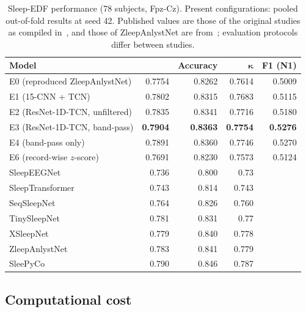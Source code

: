 \documentclass[11pt,a4paper]{article}
\newcommand{\mf}{\text{macro-F1}}
\begin{document}
\begin{table}[t]
\centering
\caption{Sleep-EDF performance (78 subjects, Fpz-Cz). Present configurations: pooled out-of-fold
results at seed 42. Published values are those of the original studies as compiled
in~\cite{lee2024sleepyco}, and those of ZleepAnlystNet are from~\cite{jadhav2024zleepanlystnet};
evaluation protocols differ between studies.}
\label{tab:sleepedf-performance}
\small
\begin{tabular}{lrrrr}
\toprule
\textbf{Model} & \textbf{\mf} & \textbf{Accuracy} & $\boldsymbol{\kappa}$ & \textbf{F1 (N1)} \\
\midrule
E0 (reproduced ZleepAnlystNet) & 0.7754 & 0.8262 & 0.7614 & 0.5009 \\
E1 (15-CNN + TCN)              & 0.7802 & 0.8315 & 0.7683 & 0.5115 \\
E2 (ResNet-1D-TCN, unfiltered) & 0.7835 & 0.8341 & 0.7716 & 0.5180 \\
E3 (ResNet-1D-TCN, band-pass)  & \textbf{0.7904} & \textbf{0.8363} & \textbf{0.7754} & \textbf{0.5276} \\
E4 (band-pass only)            & 0.7891 & 0.8360 & 0.7746 & 0.5270 \\
E6 (record-wise $z$-score)     & 0.7691 & 0.8230 & 0.7573 & 0.5124 \\
\midrule
SleepEEGNet~\cite{mousavi2019sleepeegnet} & 0.736 & 0.800 & 0.73 & \\
SleepTransformer~\cite{phan2022sleeptransformer} & 0.743 & 0.814 & 0.743 & \\
SeqSleepNet~\cite{phan2019seqsleepnet} & 0.764 & 0.826 & 0.760 & \\
TinySleepNet~\cite{supratak2020tinysleepnet} & 0.781 & 0.831 & 0.77 & \\
XSleepNet~\cite{phan2022xsleepnet} & 0.779 & 0.840 & 0.778 & \\
ZleepAnlystNet~\cite{jadhav2024zleepanlystnet} & 0.783 & 0.841 & 0.779 & \\
SleePyCo~\cite{lee2024sleepyco} & 0.790 & 0.846 & 0.787 & \\
\bottomrule
\end{tabular}
\end{table}

\subsection{Computational cost}
\end{document}
